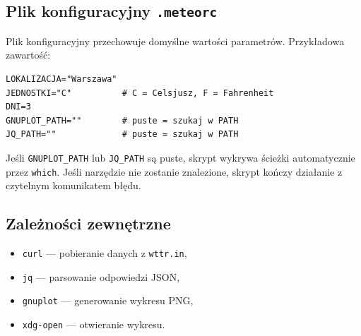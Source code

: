 \documentclass[a4paper,11pt]{article}
\begin{document}
\subsection*{Plik konfiguracyjny \texttt{.meteorc}}

Plik konfiguracyjny przechowuje domyślne wartości parametrów.
Przykładowa zawartość:

\begin{verbatim}
LOKALIZACJA="Warszawa"
JEDNOSTKI="C"          # C = Celsjusz, F = Fahrenheit
DNI=3
GNUPLOT_PATH=""        # puste = szukaj w PATH
JQ_PATH=""             # puste = szukaj w PATH
\end{verbatim}

Jeśli \texttt{GNUPLOT\_PATH} lub \texttt{JQ\_PATH} są puste, skrypt
wykrywa ścieżki automatycznie przez \texttt{which}. Jeśli narzędzie
nie zostanie znalezione, skrypt kończy działanie z czytelnym komunikatem błędu.

\subsection*{Zależności zewnętrzne}

\begin{itemize}[noitemsep]
    \item \texttt{curl} — pobieranie danych z \texttt{wttr.in},
    \item \texttt{jq} — parsowanie odpowiedzi JSON,
    \item \texttt{gnuplot} — generowanie wykresu PNG,
    \item \texttt{xdg-open} — otwieranie wykresu.
\end{itemize}
\end{document}
